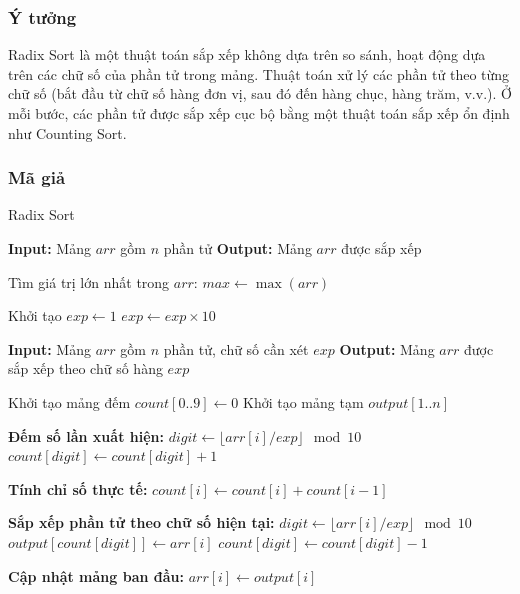 \subsubsection{Ý tưởng}
Radix Sort là một thuật toán sắp xếp không dựa trên so sánh, hoạt động dựa trên các chữ số của phần tử trong mảng. Thuật toán xử lý các phần tử theo từng chữ số (bắt đầu từ chữ số hàng đơn vị, sau đó đến hàng chục, hàng trăm, v.v.). Ở mỗi bước, các phần tử được sắp xếp cục bộ bằng một thuật toán sắp xếp ổn định như Counting Sort.

\subsubsection{Mã giả}

\begin{algorithm}[H]
\caption{Radix Sort}
\begin{algorithmic}[1]
    \State \textbf{Input:} Mảng $arr$ gồm $n$ phần tử
    \State \textbf{Output:} Mảng $arr$ được sắp xếp
    
    \State Tìm giá trị lớn nhất trong $arr$: $max \gets \max(arr)$
    
    \State Khởi tạo $exp \gets 1$ 
        \State {} 
        \State $exp \gets exp \times 10$
    \EndWhile
\EndProcedure

    \State \textbf{Input:} Mảng $arr$ gồm $n$ phần tử, chữ số cần xét $exp$
    \State \textbf{Output:} Mảng $arr$ được sắp xếp theo chữ số hàng $exp$
    
    \State Khởi tạo mảng đếm $count[0..9] \gets 0$
    \State Khởi tạo mảng tạm $output[1..n]$
    
    \State \textbf{Đếm số lần xuất hiện:}
        \State $digit \gets \lfloor arr[i] / exp \rfloor \mod 10$
        \State $count[digit] \gets count[digit] + 1$
    \EndFor
    
    \State \textbf{Tính chỉ số thực tế:}
        \State $count[i] \gets count[i] + count[i-1]$
    \EndFor
    
    \State \textbf{Sắp xếp phần tử theo chữ số hiện tại:}
        \State $digit \gets \lfloor arr[i] / exp \rfloor \mod 10$
        \State $output[count[digit]] \gets arr[i]$
        \State $count[digit] \gets count[digit] - 1$
    \EndFor
    
    \State \textbf{Cập nhật mảng ban đầu:}
        \State $arr[i] \gets output[i]$
    \EndFor
\EndProcedure
\end{algorithmic}
\end{algorithm}

